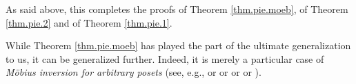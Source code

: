 As said above, this completes the proofs of Theorem \ref{thm.pie.moeb}, of
Theorem \ref{thm.pie.2} and of Theorem \ref{thm.pie.1}.

While Theorem \ref{thm.pie.moeb} has played the part of the ultimate
generalization to us, it can be generalized further. Indeed, it is merely a
particular case of \emph{M\"{o}bius inversion for arbitrary posets} (see,
e.g., \cite[Proposition 3.7.1]{Stanley-EC1} or \cite[Theorem 2.3.1]{Martin21}
or \cite[Theorem 5.5.5]{Sagan19} or \cite[Theorem 6.10]{Sam21} or
\cite[Theorem 14.6.4]{Wagner20}).

